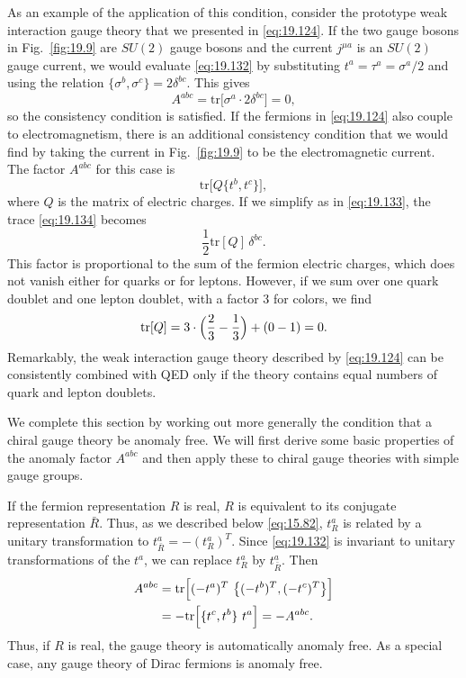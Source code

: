 As an example of the application of this condition, consider the prototype
weak interaction gauge theory that we presented in \eqref{eq:19.124}.  If the
two gauge bosons in Fig.~\ref{fig:19.9} are $SU(2)$ gauge bosons and the
current $j^{\mu a}$ is an $SU(2)$ gauge current, we would evaluate
\eqref{eq:19.132} by substituting $t^a = \tau^a = \sigma^a/2$ and using the
relation $\{\sigma^b, \sigma^c\} = 2\delta^{bc}$.  This gives
\begin{equation}
  A^{abc} = \mathrm{tr}\bigl[ \sigma^a\cdot 2\delta^{bc} \bigr] = 0 ,
  \label{eq:19.133}
\end{equation}
so the consistency condition is satisfied.  If the fermions in
\eqref{eq:19.124} also couple to electromagnetism, there is an additional
consistency condition that we would find by taking the current in
Fig.~\ref{fig:19.9} to be the electromagnetic current.  The factor $A^{abc}$
for this case is
\begin{equation}
  \mathrm{tr}\bigl[ Q\{t^b, t^c\} \bigr] ,
  \label{eq:19.134}
\end{equation}
where $Q$ is the matrix of electric charges.  If we simplify as in
\eqref{eq:19.133}, the trace \eqref{eq:19.134} becomes
\begin{equation}
  \frac{1}{2}\mathrm{tr}[Q]\,\delta^{bc} .
  \label{eq:19.135}
\end{equation}
This factor is proportional to the sum of the fermion electric charges, which
does not vanish either for quarks or for leptons.  However, if we sum over one
quark doublet and one lepton doublet, with a factor 3 for colors, we find
\begin{equation}
  \mathrm{tr}[Q] = 3\cdot\Bigl( \frac{2}{3} - \frac{1}{3} \Bigr)
    + (0 - 1) = 0 .
  \label{eq:19.136}
\end{equation}
Remarkably, the weak interaction gauge theory described by \eqref{eq:19.124}
can be consistently combined with QED only if the theory contains equal
numbers of quark and lepton doublets.

We complete this section by working out more generally the condition that a
chiral gauge theory be anomaly free.  We will first derive some basic
properties of the anomaly factor $A^{abc}$ and then apply these to chiral
gauge theories with simple gauge groups.

If the fermion representation $R$ is real, $R$ is equivalent to its conjugate
representation $\bar{R}$.  Thus, as we described below \eqref{eq:15.82},
$t^a_R$ is related by a unitary transformation to
$t^a_{\bar{R}} = -(t^a_R)^T$.  Since \eqref{eq:19.132} is invariant to
unitary transformations of the $t^a$, we can replace $t^a_R$ by $t^a_{\bar{R}}$.
Then
\begin{equation}
  \begin{aligned}
    A^{abc} &= \mathrm{tr}\Bigl[ (-t^a)^T\ \bigl\{ (-t^b)^T, (-t^c)^T
      \bigr\} \Bigr]\\
    &= -\mathrm{tr}\Bigl[ \{ t^c, t^b \}\ t^a \Bigr] = -A^{abc} .
  \end{aligned}
  \label{eq:19.137}
\end{equation}
Thus, if $R$ is real, the gauge theory is automatically anomaly free.  As a
special case, any gauge theory of Dirac fermions is anomaly free.

